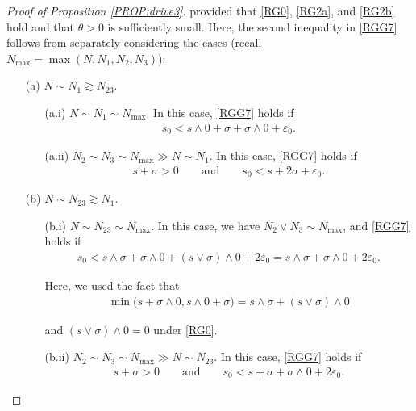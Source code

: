 \documentclass[letterpaper, 11pt,  reqno]{amsart}
\newcommand{\1}{\hspace{0.5mm}\textup{I}\hspace{0.5mm}}
\newcommand{\noi}{\noindent}
\newcommand{\eps}{\varepsilon}
\newcommand{\s}{\sigma}
\newcommand{\ta}{\theta}
\newcommand{\ges}{\gtrsim}
\numberwithin{equation}{section}
\numberwithin{theorem}{section}
\begin{document}
\begin{proof} [Proof of Proposition \ref{PROP:drive3}]
\noi
provided that 
\eqref{RG0}, \eqref{RG2a}, and \eqref{RG2b} hold
and 
that $\ta > 0$ is sufficiently small.
Here, the second inequality in \eqref{RGG7} follows
from separately considering the cases
(recall  $N_{\max} = \max(N, N_1, N_2, N_3)$):

\smallskip
\begin{itemize}
\item[(a)] 
$N\sim N_1 \ges N_{23}$.

\smallskip

\begin{itemize}
\item[(a.i)] 
$N \sim N_1 \sim N_{\max}$. 
In this case, \eqref{RGG7} holds if 
\begin{align}
s_0 <  s\wedge 0 + \s +  \s\wedge 0 + \eps _0 .
\label{RGY1}
\end{align}

\smallskip

\item[(a.ii)]
 $N_2 \sim N_3\sim N_{\max} \gg  N \sim N_1$.
In this case, \eqref{RGG7} holds if 
\begin{align}
s+\s > 0
\qquad \text{and}\qquad
s_0 < s+ 2\s + \eps _0.
\label{RGY2}
\end{align}

\end{itemize}





\smallskip
\item[(b)] 
$N\sim N_{23} \ges N_1$.



\smallskip
\begin{itemize}
\item[(b.i)] 
$N\sim N_{23} \sim N_{\max}$. 
In this case, we have $N_2 \vee N_3 \sim N_{\max}$, 
and \eqref{RGG7} holds if 
\begin{align}
s_0 < s\wedge \s  + \s \wedge 0 + (s\vee \s) \wedge 0+ 2\eps_0
= s\wedge \s  + \s \wedge 0 +  2\eps_0.
\label{RGY3}
\end{align}

\noi
Here, we used the fact that 
\begin{align}
\min \big( s + \s \wedge 0, s\wedge 0 + \s\big)
=  s\wedge \s  + (s\vee \s) \wedge 0
\label{RGY4}
\end{align}

\noi
and
$(s\vee \s) \wedge 0 = 0$ under \eqref{RG0}.

\smallskip
\item[(b.ii)]
 $N_2 \sim N_3\sim N_{\max} \gg N\sim N_{23}$.
In this case, \eqref{RGG7} holds if 
\begin{align}
s+\s > 0
\qquad \text{and}\qquad 
s_0 < s + \s + \s\wedge 0 + 2\eps_0.
\label{RGY5}
\end{align}
\end{itemize}





\end{itemize}
\end{proof}
\end{document}
